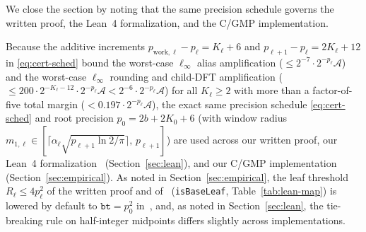 We close the section by noting that the same precision schedule governs the written proof, the Lean~4 formalization, and the C/GMP implementation.

\begin{remark}\label{rem:schedules}
Because the additive increments $p_{\mathrm{work},\ell} - p_\ell = K_\ell + 6$ and $p_{\ell+1} - p_\ell = 2 K_\ell + 12$ in \eqref{eq:cert-sched} bound the worst-case $\ell_\infty$ alias amplification ($\le 2^{-7} \cdot 2^{-p_\ell}\mathcal{A}$) and the worst-case $\ell_\infty$ rounding and child-DFT amplification ($\le 200 \cdot 2^{-K_\ell - 12} \cdot 2^{-p_\ell}\mathcal{A} < 2^{-6} \cdot 2^{-p_\ell}\mathcal{A}$) for all $K_\ell \ge 2$ with more than a factor-of-five total margin ($< 0.197 \cdot 2^{-p_\ell}\mathcal{A}$), the exact same precision schedule \eqref{eq:cert-sched} and root precision $p_0 = 2b + 2K_0 + 6$ (with window radius \mbox{$m_{1,\ell} \in [\lceil \alpha_\ell\sqrt{p_{\ell+1}\ln 2 / \pi} \rceil,\, p_{\ell+1}]$}) are used across our written proof, our Lean~4 formalization~\cite{LeanMS26} (Section~\ref{sec:lean}), and our C/GMP implementation~\cite{CGMP26} (Section~\ref{sec:empirical}). As noted in Section~\ref{sec:empirical}, the leaf threshold $R_\ell \le 4 p_\ell^2$ of the written proof and of~\cite{LeanMS26} (\texttt{isBaseLeaf}, Table~\ref{tab:lean-map}) is lowered by default to $\texttt{bt} = p_0^2$ in~\cite{CGMP26}, and, as noted in Section~\ref{sec:lean}, the tie-breaking rule on half-integer midpoints differs slightly across implementations.
\end{remark}
